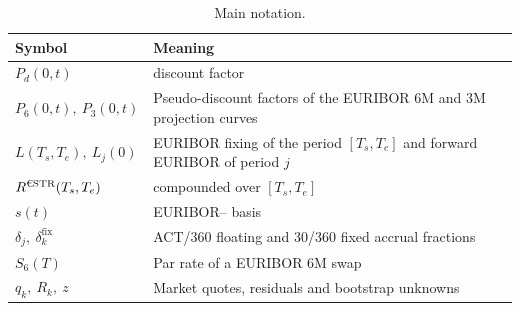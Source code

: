 \documentclass[11pt,a4paper]{article}
\theoremstyle{plain}
\theoremstyle{definition}
\newcommand{\estr}{\text{\texteuro STR}}
\begin{document}
\begin{table}[h]
\centering
\begin{tabular}{@{}lp{11.5cm}@{}}
\toprule
Symbol & Meaning \\
\midrule
$P_d(0,t)$ & \estr{} discount factor \\
$P_6(0,t),\ P_3(0,t)$ & Pseudo-discount factors of the EURIBOR 6M and 3M projection curves \\
$L(T_s,T_e),\ L_j(0)$ & EURIBOR fixing of the period $[T_s,T_e]$ and forward EURIBOR of period $j$ \\
$R^{\estr}(T_s,T_e)$ & \estr{} compounded over $[T_s,T_e]$ \\
$s(t)$ & EURIBOR--\estr{} basis \\
$\delta_j,\ \delta^{\mathrm{fix}}_k$ & ACT/360 floating and 30/360 fixed accrual fractions \\
$S_6(T)$ & Par rate of a EURIBOR 6M swap \\
$q_k,\ R_k,\ z$ & Market quotes, residuals and bootstrap unknowns \\
\bottomrule
\end{tabular}
\caption{Main notation.}
\label{tab:notation}
\end{table}

\clearpage
\end{document}
